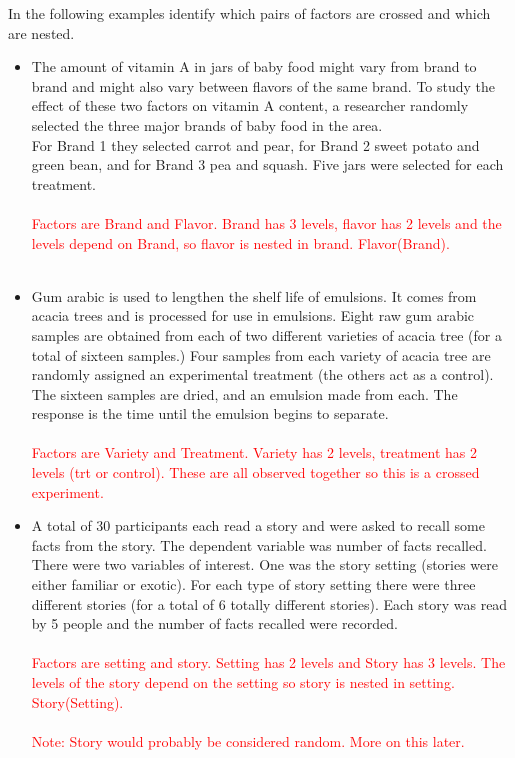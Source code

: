 In the following examples identify which pairs of factors are crossed and which are nested.
\begin{itemize}
\item The amount of vitamin A in jars of baby food might vary from brand to brand and might also vary between flavors of the same brand. To study the effect of these two factors on vitamin A content, a researcher randomly selected the three major brands of baby food in the area.\\
For Brand 1 they selected carrot and pear, for Brand 2 sweet potato and green bean, and for Brand 3 pea and squash.   Five jars were selected for each treatment.\\~\\%
\textcolor{red}{Factors are Brand and Flavor.  Brand has 3 levels, flavor has 2 levels and the levels depend on Brand, so flavor is nested in brand.  Flavor(Brand).}\\~\\
\item Gum arabic is used to lengthen the shelf life of emulsions. It comes from acacia trees and is processed for use in emulsions. Eight raw gum arabic samples are obtained from each of two different varieties of acacia tree (for a total of sixteen samples.)  Four samples from each variety of acacia tree are randomly assigned an experimental treatment (the others act as a control).  The sixteen samples are dried, and an emulsion made from each. The response is the time until the emulsion begins to separate.\\~\\%
\textcolor{red}{Factors are Variety and Treatment.  Variety has 2 levels, treatment has 2 levels (trt or control).  These are all observed together so this is a crossed experiment.}\\
\item A total of 30 participants each read a story and were asked to recall some facts from the story. The dependent variable was number of facts recalled. There were two variables of interest.  One was the story setting (stories were either familiar or exotic).  For each type of story setting there were three different stories (for a total of 6 totally different stories).  Each story was read by 5 people and the number of facts recalled were recorded.\\~\\
\textcolor{red}{Factors are setting and story.  Setting has 2 levels and Story has 3 levels.  The levels of the story depend on the setting so story is nested in setting.  Story(Setting).\\~\\
Note: Story would probably be considered random.  More on this later.}
\end{itemize}

